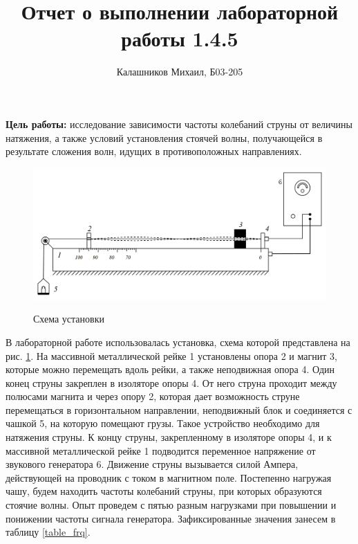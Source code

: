 \documentclass[14pt, a4paper]{article}
\title{\textbf{Отчет о выполнении лабораторной работы 1.4.5}}
\author{Калашников Михаил, Б03-205}
\date{}
\begin{document}
\maketitle

\textbf{Цель работы:} исследование зависимости частоты колебаний струны от величины натяжения, а также условий установления стоячей волны, получающейся в результате сложения волн, идущих в противоположных направлениях.

\begin{figure}[!h]
\centering
\includegraphics[scale=0.25]{laba7_setup.png}
\label{img_setup}
\caption{Схема установки}
\end{figure}

В лабораторной работе использовалась установка, схема которой представлена на рис. \ref{img_setup}. На массивной металлической рейке 1 установлены опора 2 и магнит 3, которые можно перемещать вдоль рейки, а также неподвижная опора 4. Один конец струны закреплен в изоляторе опоры 4. От него струна проходит между полюсами магнита и через опору 2, которая дает возможность струне перемещаться в горизонтальном направлении, неподвижный блок и соединяется с чашкой 5, на которую помещают грузы. Такое устройство необходимо для натяжения струны. К концу струны, закрепленному в изоляторе опоры 4, и к массивной металлической рейке 1 подводится переменное напряжение от звукового генератора 6. Движение струны вызывается силой Ампера, действующей на проводник с током в магнитном поле.
Постепенно нагружая чашу, будем находить частоты колебаний струны, при которых образуются стоячие волны. Опыт проведем с пятью разным нагрузками при повышении и понижении частоты сигнала генератора. Зафиксированные значения занесем в таблицу \ref{table_frq}.
\newpage
\end{document}
